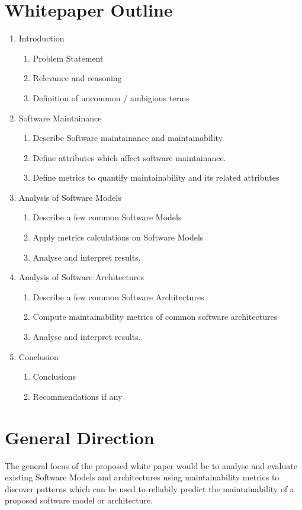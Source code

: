 \documentclass[dvips,12pt]{article}
\begin{document}
\section{Whitepaper Outline}
\begin{enumerate}
	\item Introduction
	\begin{enumerate}
		\item Problem Statement
		\item Relevance and reasoning
		\item Definition of uncommon / ambigious terms
	\end{enumerate}
	\item Software Maintainance
		\begin{enumerate}
			\item Describe Software maintainance and maintainability.
			\item Define attributes which affect software maintainance.
			\item Define metrics to quantify maintainability and its related attributes
		\end{enumerate}
	\item Analysis of Software Models
	\begin{enumerate}
		\item Describe a few common Software Models
		\item Apply metrics calculations on Software Models
		\item Analyse and interpret results. 
	\end{enumerate}
	\item Analysis of Software Architectures
	\begin{enumerate}
		\item Describe a few common Software Architectures
		\item Compute maintainability metrics of common software architectures
		\item Analyse and interpret results.
	\end{enumerate}
	\item Conclusion
	\begin{enumerate}
		\item Conclusions
		\item Recommendations if any
	\end{enumerate}
\end{enumerate}

\section{General Direction}
The general focus of the proposed white paper would be to analyse and evaluate existing Software Models and architectures using maintainability metrics to discover patterns which can be used to reliabily predict the maintainability of a proposed software model or architecture. 
\end{document}
